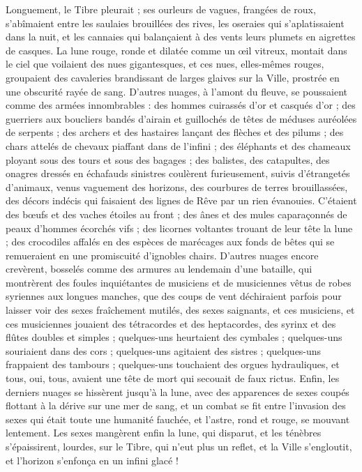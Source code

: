 \documentclass[a4paper, 11pt, oneside, polutonikogreek, french]{article}
\begin{document}
Longuement, le Tibre pleurait ; ses ourleurs de vagues, frangées de roux, s'abîmaient entre les saulaies brouillées des rives, les oseraies qui s'aplatissaient dans la nuit, et les cannaies qui balançaient à des vents leurs plumets en aigrettes de casques. La lune rouge, ronde et dilatée comme un œil vitreux, montait dans le ciel que voilaient des nues gigantesques, et ces nues, elles-mêmes rouges, groupaient des cavaleries brandissant de larges glaives sur la Ville, prostrée en une obscurité rayée de sang. D'autres nuages, à l’amont du fleuve, se poussaient comme des armées innombrables : des hommes cuirassés d'or et casqués d'or ; des guerriers aux boucliers bandés d'airain et guillochés de têtes de méduses auréolées de serpents ; des archers et des hastaires lançant des flèches et des pilums ; des chars attelés de chevaux piaffant dans de l'infini ; des éléphants et des chameaux ployant sous des tours et sous des bagages ; des balistes, des catapultes, des onagres dressés en échafauds sinistres coulèrent furieusement, suivis d'étrangetés d'animaux, venus vaguement des horizons, des courbures de terres brouillassées, des décors indécis qui faisaient des lignes de Rêve par un rien évanouies. C'étaient des bœufs et des vaches étoiles au front ; des ânes et des mules caparaçonnés de peaux d'hommes écorchés vifs ; des licornes voltantes trouant de leur tête la lune ; des crocodiles affalés en des espèces de marécages aux fonds de bêtes qui se remueraient en une promiscuité d'ignobles chairs. D'autres nuages encore crevèrent, bosselés comme des armures au lendemain d'une bataille, qui montrèrent des foules inquiétantes de musiciens et de musiciennes vêtus de robes syriennes aux longues manches, que des coups de vent déchiraient parfois pour laisser voir des sexes fraîchement mutilés, des sexes saignants, et ces musiciens, et ces musiciennes jouaient des tétracordes et des heptacordes, des syrinx et des flûtes doubles et simples ; quelques-uns heurtaient des cymbales ; quelques-uns souriaient dans des cors ; quelques-uns agitaient des sistres ; quelques-uns frappaient des tambours ; quelques-uns touchaient des orgues hydrauliques, et tous, oui, tous, avaient une tête de mort qui secouait de faux rictus. Enfin, les derniers nuages se hissèrent jusqu'à la lune, avec des apparences de sexes coupés flottant à la dérive sur une mer de sang, et un combat se fit entre l'invasion des sexes qui était toute une humanité fauchée, et l'astre, rond et rouge, se mouvant lentement. Les sexes mangèrent enfin la lune, qui disparut, et les ténèbres s'épaissirent, lourdes, sur le Tibre, qui n'eut plus un reflet, et la Ville s'engloutit, et l'horizon s'enfonça en un infini glacé !
\end{document}
